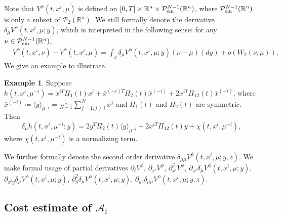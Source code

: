 \documentclass{amsart}
\theoremstyle{definition}
\newtheorem{example}[theorem]{Example}
\theoremstyle{remark}
\def\cal{\mathcal}
\numberwithin{equation}{section}
\begin{document}
Note that
$V^\phi(t, x^i, \mu)$ is defined on $[0,T]\times \mathbb{R}^n \times {\mathcal P}^{N-1}_{\rm em}({\mathbb R}^n)$, where ${\mathcal P}^{N-1}_{\rm em}({\mathbb R}^n) $ is only a subset of ${\mathcal P}_2(\mathbb{R}^n)$. We still formally denote the derivative $ \delta_\mu V^\phi(t, x^i, \mu;y)$, which is interpreted
in the following sense: for any $\nu\in{\cal P}_{\rm em}^{N-1}({\mathbb R}^n)$,
\begin{align*}
&V^\phi(t,x^i, \nu)-V^\phi(t,x^i, \mu)
= \int_y \delta_\mu V^\phi(t,x^i, \mu;y) (\nu-\mu) (dy)+ o(W_2(\nu, \mu)).
\end{align*}
We give an example to illustrate.
\begin{example}
Suppose $h(t, x^{i}, \mu^{{-i}})= x^{iT}\Pi_1(t) x^i + \bar x^{(-i)T} \Pi_2(t)\bar x^{(-i)}+ 2 x^{iT} \Pi_{12}(t) \bar x^{(-i)}  $, where $ \bar x^{(-i)}\coloneqq \langle y \rangle_{\mu^{-i}}=\frac{1}{N-1}\sum_{j=1,j\ne i}^N x^j $ and $\Pi_1(t)$ and $\Pi_2(t)$ are symmetric. Then  $$
\delta_\mu h(t, x^i, \mu^{-i}; y)= 2 y^T\Pi_2(t) \langle y \rangle_{\mu^{-i}} + 2 x^{iT} \Pi_{12}(t) y  +\chi(t,x^i, \mu^{-i}),
$$
 where $\chi(t,x^i, \mu^{-i})$ is a normalizing term.
\end{example}

We further formally denote the second order derivative $\delta_{\mu\mu} V^\phi(t, x^i, \mu; y,z)$.
 We make formal usage of  partial derivatives
$\partial_t V^\phi$, $\partial_{x^i} V^\phi$, $\partial_{x^i}^2 V^\phi$,
$\partial_{x^i}\delta_\mu V^\phi(t, x^i, \mu;y)$, $\partial_{x^iy}\delta_\mu V^\phi(t, x^i, \mu;y)$, $\partial_{y}^2\delta_\mu V^\phi(t, x^i, \mu;y)$, $\partial_{yz}\delta_{\mu\mu} V^\phi(t, x^i, \mu;y,z)$.

\subsection{Cost estimate of ${\cal A}_i$}
\end{document}
